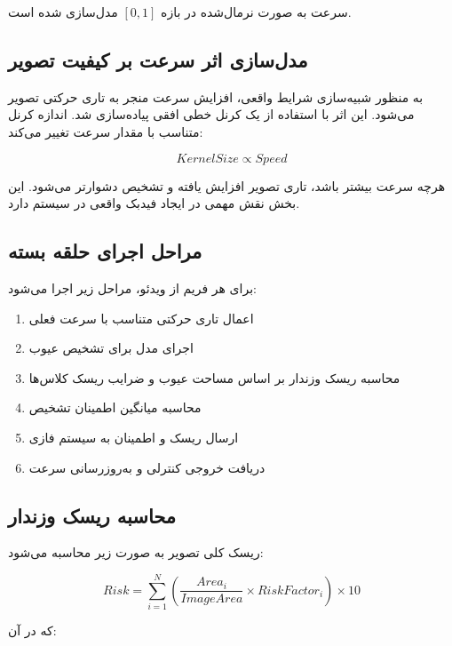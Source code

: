 \documentclass[a4paper, 10pt, twocolumn]{article}
\begin{document}
	سرعت به صورت نرمال‌شده در بازه $[0,1]$ مدل‌سازی شده است.
	
	
	\subsection{مدل‌سازی اثر سرعت بر کیفیت تصویر}
	
	به منظور شبیه‌سازی شرایط واقعی، افزایش سرعت منجر به تاری حرکتی تصویر می‌شود. این اثر با استفاده از یک کرنل خطی افقی پیاده‌سازی شد. اندازه کرنل متناسب با مقدار سرعت تغییر می‌کند:
	
	\[
	KernelSize \propto Speed
	\]
	
	هرچه سرعت بیشتر باشد، تاری تصویر افزایش یافته و تشخیص دشوارتر می‌شود. این بخش نقش مهمی در ایجاد فیدبک واقعی در سیستم دارد.
	
	
	\subsection{مراحل اجرای حلقه بسته}
	
	برای هر فریم از ویدئو، مراحل زیر اجرا می‌شود:
	
	\begin{enumerate}
		\item اعمال تاری حرکتی متناسب با سرعت فعلی
		\item اجرای مدل  برای تشخیص عیوب
		\item محاسبه ریسک وزندار بر اساس مساحت عیوب و ضرایب ریسک کلاس‌ها
		\item محاسبه میانگین اطمینان تشخیص
		\item ارسال ریسک و اطمینان به سیستم فازی
		\item دریافت خروجی کنترلی و به‌روزرسانی سرعت
	\end{enumerate}
	
	
	\subsection{محاسبه ریسک وزندار}
	
	ریسک کلی تصویر به صورت زیر محاسبه می‌شود:
	
	\[
	Risk = \sum_{i=1}^{N} 
	\left(
	\frac{Area_i}{ImageArea}
	\times RiskFactor_i
	\right)
	\times 10
	\]
	
	که در آن:
	
\end{document}
